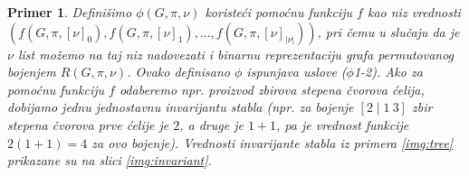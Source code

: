 \documentclass[12pt,oneside]{memoir}
\newtheorem{example}{Primer}
\theoremstyle{definition}
\begin{document}
  \begin{example}
	  Definišimo $\phi(G, \pi, \nu)$ koristeći pomoćnu funkciju $f$ kao niz
	  vrednosti $(f(G, \pi, [\nu]_0), f(G, \pi, [\nu]_1), \dots, f(G, \pi,
	  [\nu]_{|\nu|}))$, pri čemu u slučaju da je $\nu$ list možemo na taj niz
	  nadovezati i binarnu reprezentaciju grafa permutovanog bojenjem $R(G,
	  \pi, \nu)$. Ovako definisano $\phi$ ispunjava uslove ($\phi$1-2). Ako za
	  pomoćnu funkciju $f$ odaberemo npr. proizvod zbirova stepena čvorova
	  ćelija, dobijamo jednu jednostavnu invarijantu stabla (npr. za bojenje
	  $[2 \mid 1\ 3]$ zbir stepena čvorova prve ćelije je $2$, a druge je $1 +
	  1$, pa je vrednost funkcije $2(1+1)=4$ za ovo bojenje). Vrednosti
	  invarijante stabla iz primera \ref{img:tree} prikazane su na slici
	  \ref{img:invariant}.
  \end{example}
\end{document}
